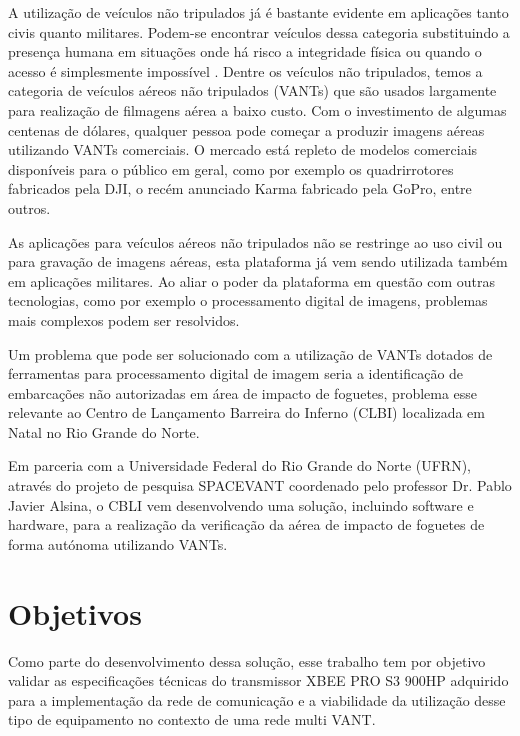 \label{Cap:introducao}

A utilização de veículos não tripulados já é bastante evidente em aplicações tanto civis quanto militares. Podem-se encontrar veículos dessa categoria substituindo a presença humana em situações onde há risco a integridade física ou quando o acesso é simplesmente impossível \cite{UAVSurveypt1}. Dentre os veículos não tripulados, temos a categoria de veículos aéreos não tripulados (VANTs) que são usados largamente para realização de filmagens aérea a baixo custo. Com o investimento de algumas centenas de dólares, qualquer pessoa pode começar a produzir imagens aéreas utilizando VANTs comerciais. O mercado está repleto de modelos comerciais disponíveis para o público em geral, como por exemplo os quadrirrotores fabricados pela DJI\textregistered, o recém anunciado Karma fabricado pela GoPro\textregistered, entre outros.

As aplicações para veículos aéreos não tripulados não se restringe ao uso civil ou para gravação de imagens aéreas, esta plataforma já vem sendo utilizada também em aplicações militares. Ao aliar o poder da plataforma em questão com outras tecnologias, como por exemplo o processamento digital de imagens, problemas mais complexos podem ser resolvidos. 

Um problema que pode ser solucionado com a utilização de VANTs dotados de ferramentas para processamento digital de imagem seria a identificação de embarcações não autorizadas em área de impacto de foguetes, problema esse relevante ao Centro de Lançamento Barreira do Inferno (CLBI) localizada em Natal no Rio Grande do Norte. 

Em parceria com a Universidade Federal do Rio Grande do Norte (UFRN), através do projeto de pesquisa SPACEVANT coordenado pelo professor Dr. Pablo Javier Alsina, o CBLI vem desenvolvendo uma solução, incluindo software e hardware, para a realização da verificação da aérea de impacto de foguetes de forma autónoma utilizando VANTs. 

\section{Objetivos}

Como parte do desenvolvimento dessa solução, esse trabalho tem por objetivo validar as especificações técnicas do transmissor XBEE PRO S3 900HP adquirido para a implementação da rede de comunicação e a viabilidade da utilização desse tipo de equipamento no contexto de uma rede multi VANT.

